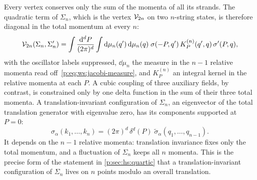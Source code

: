 Every vertex conserves only the sum of the momenta of all its strands.
The quadratic term of $\Sigma_n$, which is the vertex $\mathcal{V}_{2n}$ on two $n$-string states, is therefore diagonal in the total momentum at every $n$:
\begin{equation}
  \label{p:eq:ws:diagonal-n}
  \mathcal{V}_{2n}(\Sigma_n, \Sigma_n')
    = \int \frac{\mathrm{d}^d P}{(2\pi)^d}
      \int \mathrm{d}\mu_n(q') \, \mathrm{d}\mu_n(q) \;
      \sigma(- P, q') \, K^{(n)}_P(q', q) \, \sigma'(P, q),
\end{equation}
with the oscillator labels suppressed, $\dd\mu_n$ the measure in the $n - 1$ relative momenta read off~\eqref{p:eq:ws:jacobi-measure}, and $K^{(n)}_P$ an integral kernel in the relative momenta at each $P$.
A cubic coupling of three auxiliary fields, by contrast, is constrained only by one delta function in the sum of their three total momenta.
A translation-invariant configuration of $\Sigma_n$, an eigenvector of the total translation generator with eigenvalue zero, has its components supported at $P = 0$:
\begin{equation}
  \label{p:eq:ws:translation-invariant}
  \sigma_{\alpha}(k_1, \ldots, k_n)
    = (2\pi)^d \, \delta^d(P) \; \tilde\sigma_{\alpha}(q_1, \ldots, q_{n - 1}).
\end{equation}
It depends on the $n - 1$ relative momenta: translation invariance fixes only the total momentum, and a fluctuation of $\Sigma_n$ keeps all $n$ momenta.
This is the precise form of the statement in \cref{p:sec:hs:quartic} that a translation-invariant configuration of $\Sigma_n$ lives on $n$ points modulo an overall translation.


